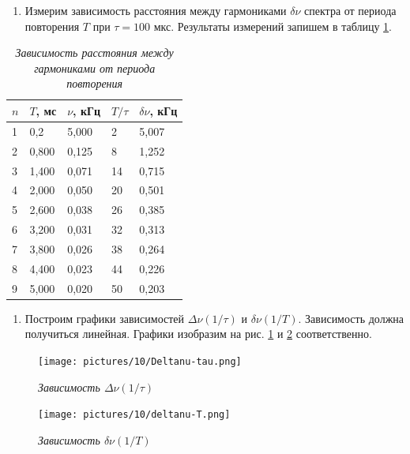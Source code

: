 \documentclass[a4paper,12pt]{article}
\begin{document}
\begin{enumerate}[resume]
    \item Измерим зависимость расстояния между гармониками $\delta \nu$ спектра от периода повторения $T$ при $\tau = 100$ мкс. Результаты измерений запишем в таблицу \ref{table:3}.
\end{enumerate}

\begin{table}[!ht]
    \centering
    \caption{\textit{Зависимость расстояния между гармониками от периода повторения}}
    \begin{tabular}{|l|l|l|l|l|}
        \hline
        $n$ & $T$, мс & $\nu$, кГц & $T / \tau$ & $\delta \nu$, кГц \\ \hline
        1 & 0,2 & 5,000 & 2 & 5,007 \\ \hline
        2 & 0,800 & 0,125 & 8 & 1,252 \\ \hline
        3 & 1,400 & 0,071 & 14 & 0,715 \\ \hline
        4 & 2,000 & 0,050 & 20 & 0,501 \\ \hline
        5 & 2,600 & 0,038 & 26 & 0,385 \\ \hline
        6 & 3,200 & 0,031 & 32 & 0,313 \\ \hline
        7 & 3,800 & 0,026 & 38 & 0,264 \\ \hline
        8 & 4,400 & 0,023 & 44 & 0,226 \\ \hline
        9 & 5,000 & 0,020 & 50 & 0,203 \\ \hline
    \end{tabular}
    \label{table:3}
\end{table}

\begin{enumerate}[resume]
    \item Построим графики зависимостей $\Delta \nu (1 / \tau)$ и $\delta \nu (1 / T)$. Зависимость должна получиться линейная. Графики изобразим на рис. \ref{graph:1} и \ref{graph:2} соответственно.
\end{enumerate}

\begin{figure}[!ht]
        \centering
	\texttt{[image: pictures/10/Deltanu-tau.png]}
	\caption{\textit{Зависимость $\Delta \nu (1 / \tau)$}}
	\label{graph:1}
\end{figure}

\begin{figure}[!ht]
        \centering
	\texttt{[image: pictures/10/deltanu-T.png]}
	\caption{\textit{Зависимость $\delta \nu (1 / T)$}}
	\label{graph:2}
\end{figure}
\end{document}
